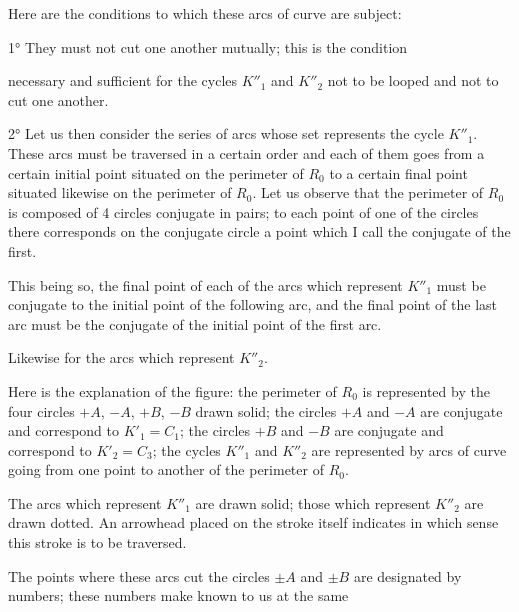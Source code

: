 \documentclass{article}
\begin{document}
Here are the conditions to which these arcs of curve are subject:

1° They must not cut one another mutually; this is the condition

necessary and sufficient for the cycles $K''_{1}$ and $K''_{2}$ not to be looped and not to cut one another.

2° Let us then consider the series of arcs whose set represents the cycle $K''_{1}$. These arcs must be traversed in a certain order and each of them goes from a certain initial point situated on the perimeter of $R_{0}$ to a certain final point situated likewise on the perimeter of $R_{0}$. Let us observe that the perimeter of $R_{0}$ is composed of 4 circles conjugate in pairs; to each point of one of the circles there corresponds on the conjugate circle a point which I call the conjugate of the first.

This being so, the final point of each of the arcs which represent $K''_{1}$ must be conjugate to the initial point of the following arc, and the final point of the last arc must be the conjugate of the initial point of the first arc.

Likewise for the arcs which represent $K''_{2}$.


Here is the explanation of the figure: the perimeter of $R_{0}$ is represented by the four circles $+A$, $-A$, $+B$, $-B$ drawn solid; the circles $+A$ and $-A$ are conjugate and correspond to $K'_{1} = C_{1}$; the circles $+B$ and $-B$ are conjugate and correspond to $K'_{2} = C_{3}$; the cycles $K''_{1}$ and $K''_{2}$ are represented by arcs of curve going from one point to another of the perimeter of $R_{0}$.

The arcs which represent $K''_{1}$ are drawn solid; those which represent $K''_{2}$ are drawn dotted. An arrowhead placed on the stroke itself indicates in which sense this stroke is to be traversed.

The points where these arcs cut the circles $\pm A$ and $\pm B$ are designated by numbers; these numbers make known to us at the same
\end{document}

